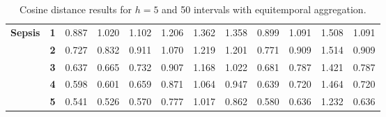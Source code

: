 \begin{table}[htbp]
\begin{tabular}{|cl|rrrrrrrrrr|}
    \midrule
    \multirow{5}[2]{*}{\textbf{Sepsis}} & \textbf{1} & \cellcolor[rgb]{ .78,  .78,  .78}0.887 & \cellcolor[rgb]{ .753,  .753,  .753}1.020 & \cellcolor[rgb]{ .737,  .737,  .737}1.102 & \cellcolor[rgb]{ .714,  .714,  .714}1.206 & \cellcolor[rgb]{ .682,  .682,  .682}1.362 & \cellcolor[rgb]{ .686,  .686,  .686}1.358 & \cellcolor[rgb]{ .776,  .776,  .776}0.899 & \cellcolor[rgb]{ .737,  .737,  .737}1.091 & \cellcolor[rgb]{ .655,  .655,  .655}1.508 & \cellcolor[rgb]{ .737,  .737,  .737}1.091 \\
          & \textbf{2} & \cellcolor[rgb]{ .812,  .812,  .812}0.727 & \cellcolor[rgb]{ .792,  .792,  .792}0.832 & \cellcolor[rgb]{ .776,  .776,  .776}0.911 & \cellcolor[rgb]{ .741,  .741,  .741}1.070 & \cellcolor[rgb]{ .714,  .714,  .714}1.219 & \cellcolor[rgb]{ .718,  .718,  .718}1.201 & \cellcolor[rgb]{ .804,  .804,  .804}0.771 & \cellcolor[rgb]{ .776,  .776,  .776}0.909 & \cellcolor[rgb]{ .651,  .651,  .651}1.514 & \cellcolor[rgb]{ .776,  .776,  .776}0.909 \\
          & \textbf{3} & \cellcolor[rgb]{ .831,  .831,  .831}0.637 & \cellcolor[rgb]{ .824,  .824,  .824}0.665 & \cellcolor[rgb]{ .812,  .812,  .812}0.732 & \cellcolor[rgb]{ .776,  .776,  .776}0.907 & \cellcolor[rgb]{ .722,  .722,  .722}1.168 & \cellcolor[rgb]{ .753,  .753,  .753}1.022 & \cellcolor[rgb]{ .82,  .82,  .82}0.681 & \cellcolor[rgb]{ .8,  .8,  .8}0.787 & \cellcolor[rgb]{ .671,  .671,  .671}1.421 & \cellcolor[rgb]{ .8,  .8,  .8}0.787 \\
          & \textbf{4} & \cellcolor[rgb]{ .839,  .839,  .839}0.598 & \cellcolor[rgb]{ .839,  .839,  .839}0.601 & \cellcolor[rgb]{ .827,  .827,  .827}0.659 & \cellcolor[rgb]{ .784,  .784,  .784}0.871 & \cellcolor[rgb]{ .745,  .745,  .745}1.064 & \cellcolor[rgb]{ .769,  .769,  .769}0.947 & \cellcolor[rgb]{ .831,  .831,  .831}0.639 & \cellcolor[rgb]{ .816,  .816,  .816}0.720 & \cellcolor[rgb]{ .663,  .663,  .663}1.464 & \cellcolor[rgb]{ .816,  .816,  .816}0.720 \\
          & \textbf{5} & \cellcolor[rgb]{ .851,  .851,  .851}0.541 & \cellcolor[rgb]{ .851,  .851,  .851}0.526 & \cellcolor[rgb]{ .843,  .843,  .843}0.570 & \cellcolor[rgb]{ .804,  .804,  .804}0.777 & \cellcolor[rgb]{ .753,  .753,  .753}1.017 & \cellcolor[rgb]{ .784,  .784,  .784}0.862 & \cellcolor[rgb]{ .843,  .843,  .843}0.580 & \cellcolor[rgb]{ .831,  .831,  .831}0.636 & \cellcolor[rgb]{ .71,  .71,  .71}1.232 & \cellcolor[rgb]{ .831,  .831,  .831}0.636 \\
    \bottomrule
    \end{tabular}%
  \caption{Cosine distance results for $h=5$ and 50 intervals with equitemporal aggregation.}
  \label{tab:equitemp_50}%
\end{table}%
